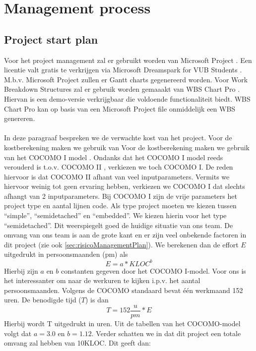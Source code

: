 \chapter{Management process}
\section{Project start plan} \label{sec:ProjectStartPlan}
Voor het project management zal er gebruikt worden van Microsoft Project \cite{MicrosoftProject}. Een licentie valt gratis te verkrijgen via Microsoft Dreamspark for VUB Students \cite{DreamsparkVUB}. M.b.v. Microsoft Project zullen er Gantt charts gegenereerd worden. Voor Work Breakdown Structures zal er gebruik worden gemaaakt van WBS Chart Pro \cite{WBSChartPro}. Hiervan is een demo-versie verkrijgbaar die voldoende functionaliteit biedt. WBS Chart Pro kan op basis van een Microsoft Project file onmiddelijk een WBS genereren.
\\
\\
In deze paragraaf bespreken we de verwachte kost van het project. Voor de kostberekening maken we gebruik van  Voor de kostberekening maken we gebruik van het COCOMO I model \cite{CocomoI}. Ondanks dat het COCOMO I model reeds verouderd is t.o.v. COCOMO II \cite{CocomoII}, verkiezen we toch COCOMO I. De reden hiervoor is dat COCOMO II afhant van veel inputparameters. Vermits we hiervoor weinig tot geen ervaring hebben, verkiezen we COCOMO I dat slechts afhangt van 2 inputparameters. Bij COCOMO I zijn de vrije parameters het project type en aantal lijnen code. Als type project moeten we kiezen tussen ``simple'', ``semidetached'' en ``embedded''. We kiezen hierin voor het type ``semidetached''. Dit weerspiegelt goed de huidige situatie van ons team. De omvang van ons team is aan de grote kant en er zijn veel onbekende factoren in dit project (zie ook \ref{sec:risicoManagementPlan}). We berekenen dan de effort $E$ uitgedrukt in persoonsmaanden (pm) als
\begin{equation*}
	E = a*KLOC^b
\end{equation*}
Hierbij zijn $a$ en $b$ constanten gegeven door het COCOMO I-model. Voor ons is het interessanter om naar de werkuren te kijken i.p.v. het aantal persoonsmaanden. Volgens de COCOMO standaard bevat \'{e}\'{e}n werkmaand 152 uren.  De benodigde tijd ($T$) is dan
\begin{equation*}
	T = 152\frac{u}{pm}*E
\end{equation*}
Hierbij wordt T uitgedrukt in uren. Uit de tabellen van het COCOMO-model volgt dat $a = 3.0$ en $b = 1.12$. Verder schatten we in dat dit project een totale omvang zal hebben van 10KLOC. Dit geeft dan:

